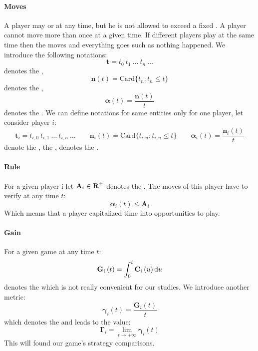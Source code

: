 \paragraph{Moves}
A player may  or  at any time, but he is
not allowed to exceed a fixed . A player cannot move  
more than once at a given time. If different players play at the same time then 
the moves  and everything goes such as nothing happened. We      
introduce the following notations:
\[ \textbf{t} = t_0 \: t_1 \: \dots \: t_n \: \dots \]
denotes the ,
\newpage
\[ \textbf{n} \left( t \right) = \mathrm{Card} \{t_n : t_n \leq t \} \]
denotes the ,
\[ \boldsymbol\alpha \left( t \right) = \frac{ \textbf{n} \left( t \right) }{t} \]
denotes the . We can define notations 
for same entities only for one player, let consider player $ i $:
\[ \textbf{t}_i = t_{i,0} \: t_{i,1} \: \dots \: t_{i,n} \: \dots
\qquad \textbf{n}_i \left( t \right) = \mathrm{Card} \{t_{i,n} : t_{i,n} \leq t \}
\qquad \boldsymbol\alpha_i \left( t \right) = \frac{ \textbf{n}_i \left( t \right) }{t} \]
denote the , the , denotes the      
.

\paragraph{Rule}
For a given player i let $ \textbf{A}_i \in \textbf{R}^+ $ denotes the . The moves of this player have to verify
at any time $ t $:
\[ \boldsymbol\alpha_i \left( t \right) \leq \textbf{A}_i \]
Which means that a player capitalized time into opportunities to play.

\paragraph{Gain}
For a given game at any time $ t $:
\[ \textbf{G}_i \left( t \right) = \int_{0}^{t} \textbf{C}_i \left( u \right) \mathrm{d} u \]
denotes the  which is not really
convenient for our studies. We introduce another metric:
\[ \boldsymbol\gamma_i \left( t \right) = \frac{\textbf{G}_i \left( t \right)}{t} \]
which denotes the  and
leads to the value:
\[ \boldsymbol\Gamma_i = \lim_{ t \rightarrow +\infty} \boldsymbol\gamma_i \left( t \right) \]
This  will found our game's strategy comparisons.

